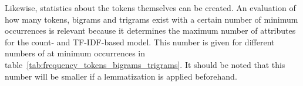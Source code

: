 \documentclass[article,type=msc,colorback,accentcolor=tud7b]{tudthesis}
\begin{document}
    \begin{figure}[H]
      \begin{floatrow}
      \end{floatrow}
    \end{figure}

    Likewise, statistics about the tokens themselves can be created. An evaluation of how many tokens, bigrams and trigrams exist with a certain number of minimum occurrences is relevant because it determines the maximum number of attributes for the count- and TF-IDF-based model. This number is given for different numbers of at minimum occurrences in table~\ref{tab:frequency_tokens_bigrams_trigrams}. It should be noted that this number will be smaller if a lemmatization is applied beforehand.
    
\end{document}
